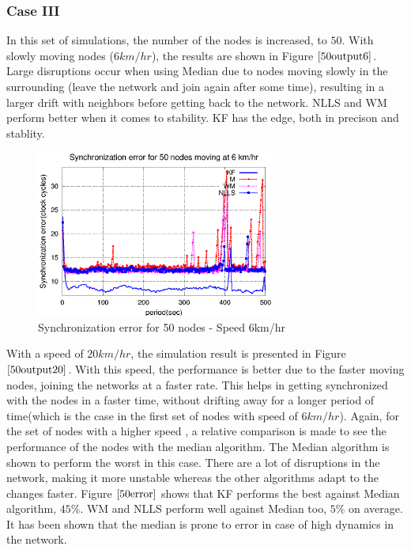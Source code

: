 \documentclass[a4paper,10pt]{report}
\begin{document}
\subsubsection{\textbf{Case III}}
In this set of simulations, the number of the nodes is increased, to $50$. With slowly moving nodes ($6km/hr$), the results are shown in Figure $\ref{50output6}$. Large disruptions occur when using Median due to nodes moving slowly in the surrounding (leave the network and join again after some time), resulting in a larger drift with neighbors before getting back to the network. NLLS and WM perform better when it comes to stability. KF has the edge, both in precison and stablity. 
\newline
\begin{figure}
\centering
\includegraphics[width=0.7\textwidth]{50output-s6}
\caption{Synchronization error for 50 nodes - Speed 6km/hr} 
\label{50output6}
\end{figure}
With a speed of $20km/hr$, the simulation result is presented in Figure $\ref{50output20}$. With this speed, the performance is
better due to the faster moving nodes, joining the networks at a faster rate. This helps in getting synchronized with the nodes in a
faster time, without drifting away for a longer period of time(which is the case in the first set of nodes with speed of $6km/hr$).
Again, for the set of nodes with a higher speed , a relative comparison is made to see the performance of the nodes with the
median algorithm.\newline
The Median algorithm is shown to perform the worst in this case. There are a lot of disruptions in the network, making it more unstable whereas the other algorithms adapt to the changes faster.
\newline 
Figure $\ref{50error}$ shows that KF performs the best against Median algorithm, $45\%$. WM and NLLS perform well against Median too, $5\%$ on average. It has been shown that the median is prone to error in case of high dynamics in the network.
\end{document}
